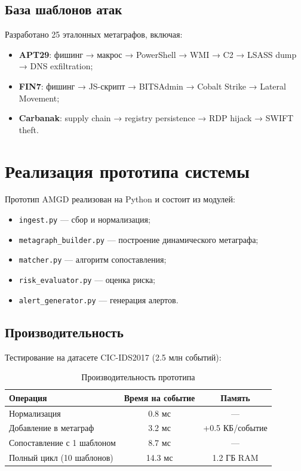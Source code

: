 \documentclass{article}
\begin{document}
\subsection{База шаблонов атак}

Разработано 25 эталонных метаграфов, включая:

\begin{itemize}
    \item \textbf{APT29}: фишинг → макрос → PowerShell → WMI → C2 → LSASS dump → DNS exfiltration;
    \item \textbf{FIN7}: фишинг → JS-скрипт → BITSAdmin → Cobalt Strike → Lateral Movement;
    \item \textbf{Carbanak}: supply chain → registry persistence → RDP hijack → SWIFT theft.
\end{itemize}
\section{Реализация прототипа системы}\label{sec:ch4/sect2}

Прототип AMGD реализован на Python и состоит из модулей:

\begin{itemize}
    \item \texttt{ingest.py} — сбор и нормализация;
    \item \texttt{metagraph\_builder.py} — построение динамического метаграфа;
    \item \texttt{matcher.py} — алгоритм сопоставления;
    \item \texttt{risk\_evaluator.py} — оценка риска;
    \item \texttt{alert\_generator.py} — генерация алертов.
\end{itemize}

\subsection{Производительность}

Тестирование на датасете CIC-IDS2017 (2.5 млн событий):

\begin{table}[h]
    \centering
    \caption{Производительность прототипа}
    \label{tab:performance}
    \begin{tabular}{lcc}
        \toprule
        Операция                   & Время на событие & Память          \\
        \midrule
        Нормализация               & 0.8 мс           & —               \\
        Добавление в метаграф      & 3.2 мс           & +0.5 КБ/событие \\
        Сопоставление с 1 шаблоном & 8.7 мс           & —               \\
        Полный цикл (10 шаблонов)  & 14.3 мс          & 1.2 ГБ RAM      \\
        \bottomrule
    \end{tabular}
\end{table}
\end{document}

